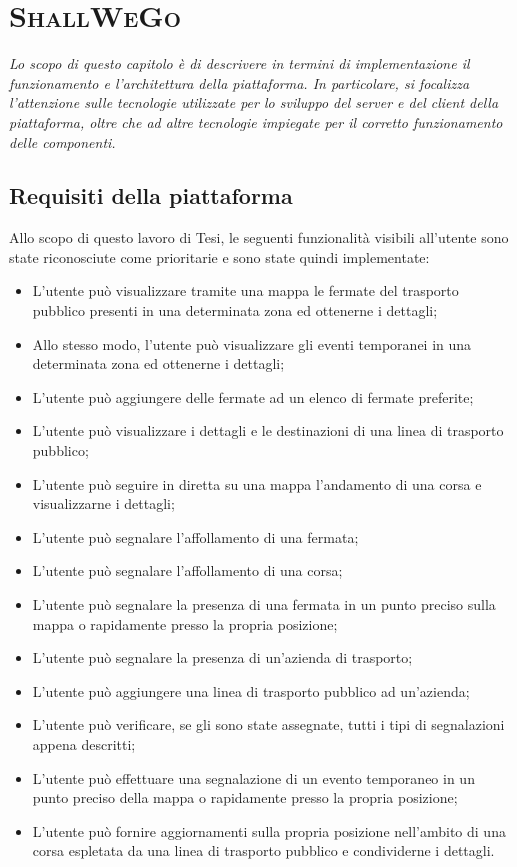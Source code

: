 \chapter{\textsc{ShallWeGo}}
\newenvironment{code}{\captionsetup{type=listing}}{}

\begin{citazione}
    \textit{Lo scopo di questo capitolo è di descrivere in termini di implementazione il funzionamento e l'architettura della piattaforma. In particolare, si focalizza l'attenzione sulle tecnologie utilizzate per lo sviluppo del server e del client della piattaforma, oltre che ad altre tecnologie impiegate per il corretto funzionamento delle componenti.}
\end{citazione}

\newpage

\section{Requisiti della piattaforma}
    Allo scopo di questo lavoro di Tesi, le seguenti funzionalità visibili all'utente sono state riconosciute come prioritarie e sono state quindi implementate:

    \begin{itemize}
        \item L'utente può visualizzare tramite una mappa le fermate del trasporto pubblico presenti in una determinata zona ed ottenerne i dettagli;
        \item Allo stesso modo, l'utente può visualizzare gli eventi temporanei in una determinata zona ed ottenerne i dettagli;
        \item L'utente può aggiungere delle fermate ad un elenco di fermate preferite;
        \item L'utente può visualizzare i dettagli e le destinazioni di una linea di trasporto pubblico;
        \item L'utente può seguire in diretta su una mappa l'andamento di una corsa e visualizzarne i dettagli;
        \item L'utente può segnalare l'affollamento di una fermata;
        \item L'utente può segnalare l'affollamento di una corsa;
        \item L'utente può segnalare la presenza di una fermata in un punto preciso sulla mappa o rapidamente presso la propria posizione;
        \item L'utente può segnalare la presenza di un'azienda di trasporto;
        \item L'utente può aggiungere una linea di trasporto pubblico ad un'azienda;
        \item L'utente può verificare, se gli sono state assegnate, tutti i tipi di segnalazioni appena descritti;
        \item L'utente può effettuare una segnalazione di un evento temporaneo in un punto preciso della mappa o rapidamente presso la propria posizione;
        \item L'utente può fornire aggiornamenti sulla propria posizione nell'ambito di una corsa espletata da una linea di trasporto pubblico e condividerne i dettagli.
    \end{itemize}

